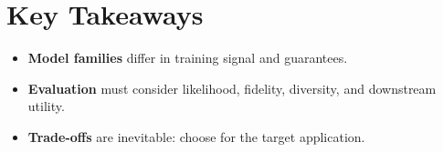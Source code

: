 
\section*{Key Takeaways}

\begin{itemize}[leftmargin=2em]
    \item \textbf{Model families} differ in training signal and guarantees.
    \item \textbf{Evaluation} must consider likelihood, fidelity, diversity, and downstream utility.
    \item \textbf{Trade-offs} are inevitable: choose for the target application.
\end{itemize}


